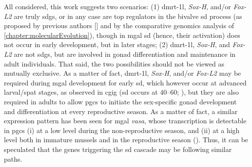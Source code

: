 All considered, this work suggests two scenarios: (1) \gls{dmrt-1l}, \textit{Sox-H}, and/or \textit{Fox-L2} are truly \glspl{sdg}, or in any case are top regulators in the bivalve \gls{sd} process (as proposed by previous authors [] and by the comparative genomics analysis of \cref{chapter:molecularEvolution}), though in \gls{mgal} \gls{sd} (hence, their activation) does not occur in early development, but in later stages; (2) \gls{dmrt-1l}, \textit{Sox-H}, and \textit{Fox-L2} are not \glspl{sdg}, but are involved in gonad differentiation and maintenance in adult individuals. That said, the two possibilities should not be viewed as mutually exclusive. As a matter of fact, \gls{dmrt-1l}, \textit{Sox-H}, and/or \textit{Fox-L2} may be required during \gls{mgal} development for early \gls{sd}, which however occur at advanced larval/spat stages, as observed in \gls{cgig} (\gls{sd} occurs at \qtyrange{40}{60}{\dpf}; ), but they are also required in adults to allow \glspl{pgc} to initiate the sex-specific gonad development and differentiation at every reproductive season. As a matter of fact, a similar expression pattern has been seen for \gls{mgal} \textit{vasa}, whose transcription is detectable in \glspl{pgc} (i) at a low level during the non-reproductive season, and (ii) at a high level both in immature mussels and in the reproductive season (). Thus, it can be speculated that the genes triggering the \gls{sd} cascade may be following similar paths.

